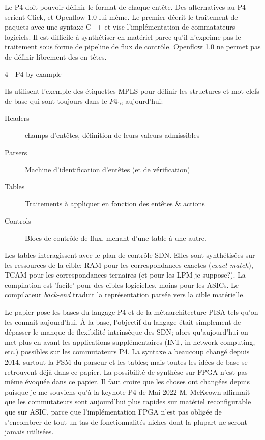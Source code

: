 Le P4 doit pouvoir définir le format de chaque entête. Des alternatives au P4 serient Click, et Openflow 1.0 lui-même. Le premier décrit le traitement de paquets avec une syntaxe C++ et vise l'implémentation de commatateurs logiciels. Il est difficile à synthétiser en matériel parce qu'il n'exprime pas le traitement sous forme de pipeline de flux de contrôle. Openflow 1.0 ne permet pas de définir librement des en-têtes.

4 - P4 by example

Ils utilisent l'exemple des étiquettes MPLS pour définir les structures et mot-clefs de base qui sont toujours dans le $P4_{16}$ aujourd'hui:
\begin{description}
	\item[Headers] champs d'entêtes, définition de leurs valeurs admissibles
	\item[Parsers] Machine d'identification d'entêtes (et de vérification)
	\item[Tables] Traitements à appliquer en fonction des entêtes \& actions
	\item[Controls] Blocs de contrôle de flux, menant d'une table à une autre.
\end{description}

Les tables interagissent avec le plan de contrôle SDN. Elles sont synthétisées sur les ressources de la cible: RAM pour les correspondances exactes (\emph{exact-match}), TCAM pour les correspondances ternaires (et pour les LPM je suppose?). La compilation est 'facile' pour des cibles logicielles, moins pour les ASICs. Le compilateur \emph{back-end} traduit la représentation parsée vers la cible matérielle.

 Le papier pose les bases du langage P4 et de la métaarchitecture PISA tels qu'on les connait aujourd'hui. À la base, l'objectif du langage était simplement de dépasser le manque de flexibilité intrinsèque des SDN; alors qu'aujourd'hui on met plus en avant les applications supplémentaires (INT, in-network computing, etc.) possibles sur les commutateurs P4. La syntaxe a beaucoup changé depuis 2014, surtout la FSM du parseur et les tables; mais toutes les idées de base se retrouvent déjà dans ce papier.
La possibilité de synthèse sur FPGA n'est pas même évoquée dans ce papier. Il faut croire que les choses ont changées depuis puisque je me souviens qu'à la keynote P4 de Mai 2022 M. McKeown affirmait que les commutateurs sont aujourd'hui plus rapides sur matériel reconfigurable que sur ASIC, parce que l'implémentation FPGA n'est pas obligée de s'encombrer de tout un tas de fonctionnalités niches dont la plupart ne seront jamais utilisées.

\clearpage
